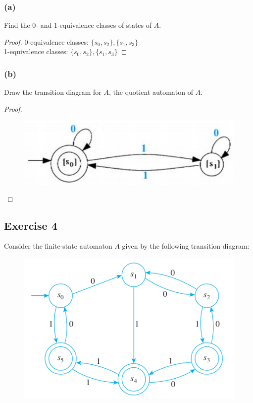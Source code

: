 \documentclass[14pt]{extarticle}
\begin{document}
\subsubsection{(a)}
Find the 0- and 1-equivalence classes of states of \(A\).
\begin{proof}
0-equivalence classes: \(\{s_0, s_2\}, \{s_1, s_3\}\) \\
1-equivalence classes: \(\{s_0, s_2\}, \{s_1, s_3\}\)
\end{proof}

\subsubsection{(b)}
Draw the transition diagram for \(\overline{A}\), the quotient automaton of \(A\).

\begin{proof}
\begin{figure}[ht!]
\centering
\includegraphics[scale=0.4]{../images/12.3.3.b.png}
\end{figure}
\end{proof}

\subsection{Exercise 4}
Consider the finite-state automaton \(A\) given by the following transition diagram:

\begin{figure}[ht!]
\centering
\includegraphics[scale=0.5]{../images/12.3.4.png}
\end{figure}
\end{document}
